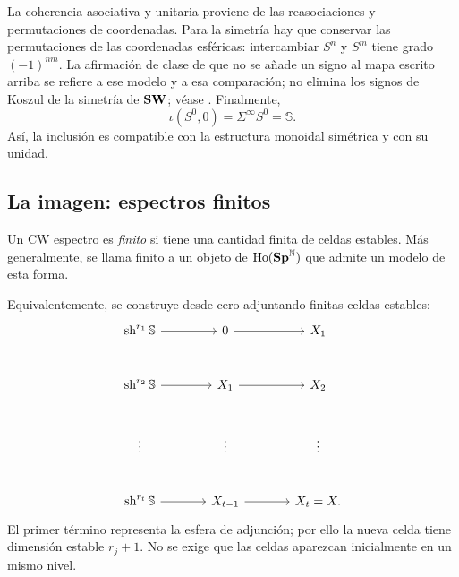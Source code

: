 La coherencia asociativa y unitaria proviene de las reasociaciones y permutaciones de coordenadas. Para la simetría hay que conservar las permutaciones de las coordenadas esféricas: intercambiar $S^n$ y $S^m$ tiene grado $(-1)^{nm}$. La afirmación de clase de que no se añade un signo al mapa escrito arriba se refiere a ese modelo y a esa comparación; no elimina los signos de Koszul de la simetría de $\mathbf{SW}$; véase \cite[Definición~4.2.2.2 y Proposición~4.2.2.3]{malkiewich}. Finalmente,
\[
\iota(S^0,0)=\Sigma^\infty S^0=\mathbb S.
\]
Así, la inclusión es compatible con la estructura monoidal simétrica y con su unidad.

\subsection{La imagen: espectros finitos}
\begin{defi}
Un CW espectro es \emph{finito} si tiene una cantidad finita de celdas estables. Más generalmente, se llama finito a un objeto de $\operatorname{Ho}(\mathbf{Sp}^{\mathbb N})$ que admite un modelo de esta forma.
\end{defi}
Equivalentemente, se construye desde cero adjuntando finitas celdas estables:
\[
\begin{tikzcd}[column sep=large,row sep=large]
\sh^{r_1}\mathbb S\arrow[r]&0\arrow[r]&X_1\\
\sh^{r_2}\mathbb S\arrow[r]&X_1\arrow[r]&X_2\\
\vdots&\vdots&\vdots\\
\sh^{r_t}\mathbb S\arrow[r]&X_{t-1}\arrow[r]&X_t=X.
\end{tikzcd}
\]
El primer término representa la esfera de adjunción; por ello la nueva celda tiene dimensión estable $r_j+1$. No se exige que las celdas aparezcan inicialmente en un mismo nivel.

